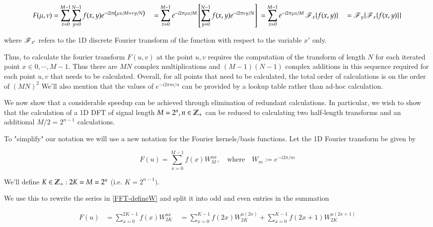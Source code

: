 \begin{align} \label{eq:2D-dft-rearrangement}
F(\mu,\nu) &= \sum_{x=0}^{M-1} \sum_{y=0}^{N-1} f(x,y) e^{-i2\pi \left(\mu x/M + \nu y/N\right)} \
&= \sum_{x=0}^{M-1} e^{-i2\pi \mu x/M} \left[ \sum_{y=0}^{N-1} f(x,y)e^{-i2\pi \nu y/N} \right] \
&= \sum_{x=0}^{M-1} e^{-i2\pi \mu x/M} \operatorname{\mathscr{F}}_x\{ f(x,y)\} \
&= \operatorname{\mathscr{F}}_y\{\operatorname{\mathscr{F}}_x \{f(x,y)\} \}
\end{align}

where $\operatorname{\mathscr{F}}_{x'}$ refers to the 1D discrete Fourier transform of the function with respect to
the variable $x'$ only.

Thus, to calculate the fourier transform $F(u,v)$ at the point $u,v$
requires the computation of the transform of length $N$ for each iterated point $x \in 0,\cdots,M-1$. Thus there are $MN$ complex multiplications and $(M-1)(N-1)$ complex additions in this sequence required for each point $u,v$ that needs to be calculated. Overall, for all points that need to be calculated, the total order of calculations is on the order of $(MN)^2$ We'll also mention that the values of $e^{-i2\pi m/n}$ can be provided by a lookup table rather than ad-hoc calculation.

We now show that a considerable speedup can be achieved through elimination of redundant calculations. In particular, we wish to show that the calculation of a 1D DFT of signal length $M=2^n, n \in \mathbb{Z}_{+}$ can be reduced to calculating two half-length transforms and an additional $M/2 = 2^{n-1}$ calculations.


To "simplify" our notation we will use a new notation for the Fourier kernels/basis functions.
Let the 1D Fourier transform be given by

\begin{equation} \label{FFT-defineW}
F(u) = \sum_{x=0}^{M-1} f(x) W_M^{ux},\quad \textrm{where} \quad W_m := e^{-i2\pi/m}
\end{equation} 

We'll define $K \in \mathbb{Z}_{+} : 2K = M = 2^n$ (i.e. $K = 2^{n-1})$.

We use this to rewrite the series in \cref{FFT-defineW} and split it into odd and even entries in the summation

\begin{align}
F(u) &= \sum_{x=0}^{2K-1} f(x) W_{2K}^{ux} \
&= \sum_{x=0}^{K-1} f(2x) W_{2K}^{u(2x)}
 + \sum_{x=0}^{K-1} f(2x+1) W_{2K}^{u(2x+1)} \label{FFT-oddevensplit}
\end{align}

